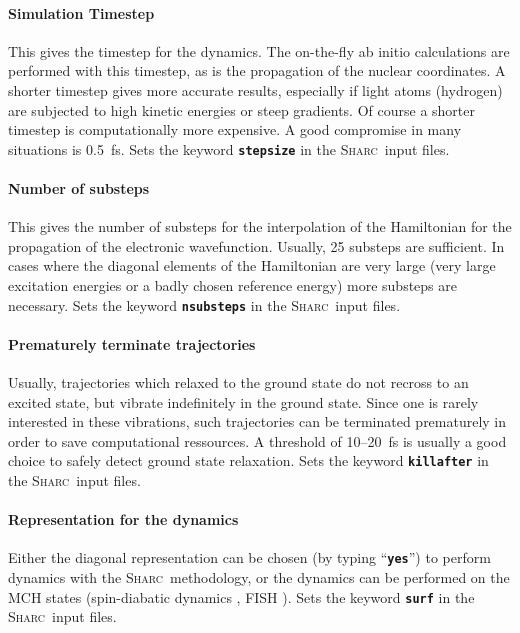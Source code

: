 \documentclass[a4paper,11pt,DIV=15,openany,twoside=false]{scrbook}
\newcommand{\sharc}{\textsc{Sharc}}
\newcommand{\ttt}[1]{\textbf{\texttt{#1}}}
\begin{document}
\paragraph{Simulation Timestep}

This gives the timestep for the dynamics. The on-the-fly ab initio calculations are performed with this timestep, as is the propagation of the nuclear coordinates. A shorter timestep gives more accurate results, especially if light atoms (hydrogen) are subjected to high kinetic energies or steep gradients. Of course a shorter timestep is computationally more expensive. A good compromise in many situations is 0.5~fs. Sets the keyword \ttt{stepsize} in the \sharc\ input files.

\paragraph{Number of substeps}

This gives the number of substeps for the interpolation of the Hamiltonian for the propagation of the electronic wavefunction. Usually, 25 substeps are sufficient. In cases where the diagonal elements of the Hamiltonian are very large (very large excitation energies or a badly chosen reference energy) more substeps are necessary. Sets the keyword \ttt{nsubsteps} in the \sharc\ input files.

\paragraph{Prematurely terminate trajectories}

Usually, trajectories which relaxed to the ground state do not recross to an excited state, but vibrate indefinitely in the ground state. Since one is rarely interested in these vibrations, such trajectories can be terminated prematurely in order to save computational ressources. A threshold of 10--20~fs is usually a good choice to safely detect ground state relaxation. Sets the keyword \ttt{killafter} in the \sharc\ input files.

\paragraph{Representation for the dynamics}

Either the diagonal representation can be chosen (by typing ``\ttt{yes}'') to perform dynamics with the \sharc\ methodology, or the dynamics can be performed on the MCH states (spin-diabatic dynamics \cite{Granucci2012JCP}, FISH \cite{Mitric2009PRA}). Sets the keyword \ttt{surf} in the \sharc\ input files.
\end{document}
